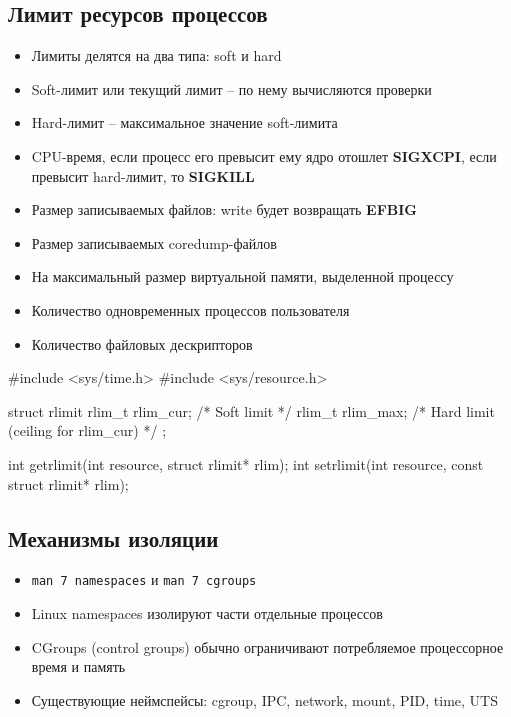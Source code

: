   \subsection{Лимит ресурсов процессов}
    \begin{itemize}
      \item Лимиты делятся на два типа: soft и hard
      \item Soft-лимит или текущий лимит -- по нему вычисляются проверки
      \item Hard-лимит -- максимальное значение soft-лимита
      \item CPU-время, если процесс его превысит ему ядро отошлет \textbf{SIGXCPI}, если превысит hard-лимит, то \textbf{SIGKILL}
      \item Размер записываемых файлов: write будет возвращать \textbf{EFBIG}
      \item Размер записываемых coredump-файлов
      \item На максимальный размер виртуальной памяти, выделенной процессу
      \item Количество одновременных процессов пользователя
      \item Количество файловых дескрипторов
    \end{itemize}

\begin{cminted}
#include <sys/time.h>
#include <sys/resource.h>

struct rlimit {
  rlim_t rlim_cur;  /* Soft limit */
  rlim_t rlim_max;  /* Hard limit (ceiling for rlim_cur) */
};

int getrlimit(int resource, struct rlimit* rlim);
int setrlimit(int resource, const struct rlimit* rlim);
\end{cminted}
  
  \subsection{Механизмы изоляции}
    \begin{itemize}
      \item \texttt{man 7 namespaces} и \texttt{man 7 cgroups}
      \item Linux namespaces изолируют части отдельные процессов
      \item CGroups (control groups) обычно ограничивают потребляемое процессорное время и память
      \item Существующие неймспейсы: cgroup, IPC, network, mount, PID, time, UTS
    \end{itemize}
